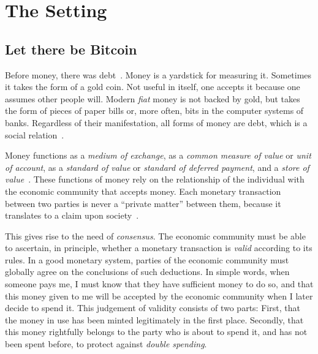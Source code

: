 \section{The Setting}
\subsection{Let there be Bitcoin}
Before money, there was debt~\cite{debt}. Money is a yardstick for measuring
it. Sometimes it takes the form of a gold coin. Not useful in itself, one
accepts it because one assumes other people will. Modern \emph{fiat} money is
not backed by gold, but takes the form of pieces of paper bills or, more often,
bits in the computer systems of banks. Regardless of their manifestation, all
forms of money are debt, which is a social relation~\cite{critical-realism}.

Money functions as a \emph{medium of exchange}, as a \emph{common measure of
value} or \emph{unit of account}, as a \emph{standard of value} or
\emph{standard of deferred payment}, and a \emph{store of
value}~\cite{money-mechanism}. These functions of money rely on the relationship
of the individual with the economic community that accepts money. Each monetary
transaction between two parties is never a ``private matter'' between them,
because it translates to a claim upon society~\cite{philosophy-of-money}.

This gives rise to the need of \emph{consensus}. The economic community must be
able to ascertain, in principle, whether a monetary transaction is \emph{valid}
according to its rules. In a good monetary system, parties of the economic
community must globally agree on the conclusions of such deductions. In simple
words, when someone pays me, I must know that they have sufficient money to do
so, and that this money given to me will be accepted by the economic community
when I later decide to spend it. This judgement of validity consists of two
parts: First, that the money in use has been minted legitimately in the first
place. Secondly, that this money rightfully belongs to the party who is about to
spend it, and has not been spent before, to protect against \emph{double spending}.

